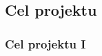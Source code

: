\documentclass[aspectratio=169]{beamer}
\begin{document}
\subsection{Cel projektu}
\begin{frame}%
	\frametitle{Cel projektu I}
	\begin{columns}
		\begin{column}{0.33\textwidth}
	   	 	\begin{figure}
	   		 \centering
	    		\end{figure}
		\end{column}
		\begin{column}{0.33\textwidth}
	   	 	\begin{figure}
	   		 \centering

\end{figure}
\end{column}
\end{columns}
\end{frame}
\end{document}
